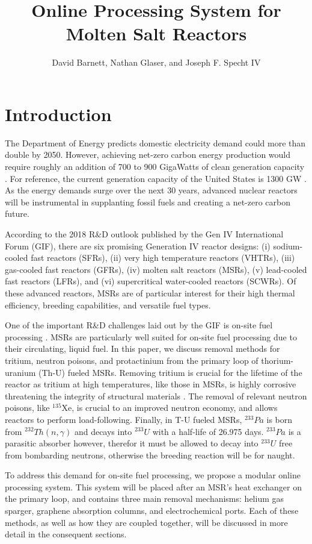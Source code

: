\documentclass{anstrans}
\title{Online Processing System for Molten Salt Reactors}
\author{David Barnett, Nathan Glaser, and Joseph F. Specht IV}
\institute{
Department of Nuclear, Plasma, and Radiological Engineering, University of Illinois Urbana-Champaign \\ davidbb2@illinois.edu, nglaser3@illinois.edu, jspecht3@illinois.edu}
\newcommand{\iso}[2]{$^{#2}$#1}
\begin{document}
\section{Introduction}
The Department of Energy predicts domestic electricity demand could more than double by 2050. However, achieving net-zero carbon energy production would require roughly an addition of 700 to 900 GigaWatts of clean generation capacity \cite{doe-summary}. For reference, the current generation capacity of the United States is 1300 GW \cite{gen-cap}. As the energy demands surge over the next 30 years, advanced nuclear reactors will be instrumental in supplanting fossil fuels and creating a net-zero carbon future.

According to the 2018 R\&D outlook published by the Gen IV International Forum (GIF), there are six promising Generation IV reactor designs: (i) sodium-cooled fast reactors (SFRs), (ii) very high temperature reactors (VHTRs), (iii) gas-cooled fast reactors (GFRs), (iv) molten salt reactors (MSRs), (v) lead-cooled fast reactors (LFRs), and (vi) supercritical water-cooled reactors (SCWRs). Of these advanced reactors, MSRs are of particular interest for their high thermal efficiency, breeding capabilities, and versatile fuel types.

One of the important R\&D challenges laid out by the GIF is on-site fuel processing \cite{GIF2018Roadmap}. MSRs are particularly well suited for on-site fuel processing due to their circulating, liquid fuel. In this paper, we discuss removal methods for tritium, neutron poisons, and protactinium from the primary loop of thorium-uranium (Th-U) fueled MSRs. Removing tritium is crucial for the lifetime of the reactor as tritium at high temperatures, like those in MSRs, is highly corrosive threatening the integrity of structural materials \cite{tritium-damage}. The removal of relevant neutron poisons, like \iso{Xe}{135}, is crucial to an improved neutron economy, and allows reactors to perform load-following. Finally, in T-U fueled MSRs, $^{233}Pa$ is born from $^{232}Th(n,\gamma)$ and decays into $^{233}U$ with a half-life of 26.975 days. $^{233}Pa$ is a parasitic absorber however, therefor it must be allowed to decay into $^{233}U$ free from bombarding neutrons, otherwise the breeding reaction will be for naught. 

To address this demand for on-site fuel processing, we propose a modular online processing system. This system will be placed after an MSR's heat exchanger on the primary loop, and contains three main removal mechanisms: helium gas sparger, graphene absorption columns, and electrochemical ports. Each of these methods, as well as how they are coupled together, will be discussed in more detail in the consequent sections.
\end{document}
